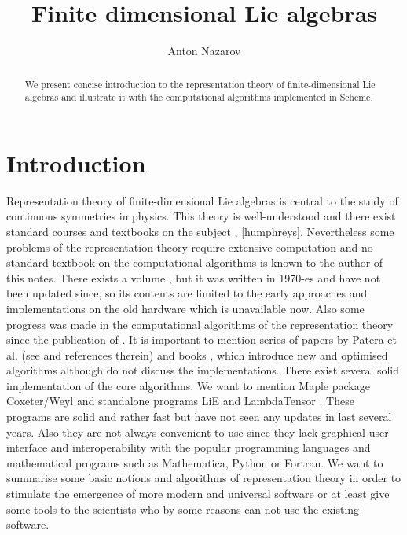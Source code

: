 \documentclass[a4paper,10pt]{article}
\theoremstyle{definition} \newtheorem{Def}{Definition}
\begin{document}
\nwdocspar
\title{Finite dimensional Lie algebras}
\author{Anton Nazarov}
\maketitle
\begin{abstract}
  We present concise introduction to the representation theory of finite-dimensional Lie algebras and illustrate it with the computational algorithms implemented in Scheme. 
\end{abstract}
\section{Introduction}
\label{sec:introduction}
Representation theory of finite-dimensional Lie algebras is central to the study of continuous symmetries in physics. This theory is well-understood and there exist standard courses and textbooks on the subject \cite{carter2005lie}, [humphreys]. Nevertheless some problems of the representation theory require extensive computation and no standard textbook on the computational algorithms is known to the author of this notes. There exists a volume \cite{belinfante1989survey}, but it was written in 1970-es and have not been updated since, so its contents are limited to the early approaches and implementations on the old hardware which is unavailable now. Also some progress was made in the computational algorithms of the representation theory since the publication of \cite{belinfante1989survey}. It is important to mention series of papers by Patera et al. (see \cite{moody1982fast} and references therein) and books \cite{kass1990ala}, \cite{bremner1985tables} which introduce new and optimised algorithms although do not discuss the implementations.
There exist several solid implementation of the core algorithms. We want to mention Maple package Coxeter/Weyl \cite{stembridge1995mps} and standalone programs LiE \cite{vanleeuwen1994lsp} and LambdaTensor \cite{fischbacher2002ilp}. These programs are solid and rather fast but have not seen any updates in last several years. Also they are not always convenient to use since they lack graphical user interface and interoperability with the popular programming languages and mathematical programs such as Mathematica, Python or Fortran.
We want to summarise some basic notions and algorithms of representation theory in order to stimulate the emergence of more modern and universal software or at least give some tools to the scientists who by some reasons can not use the existing software.
\end{document}
